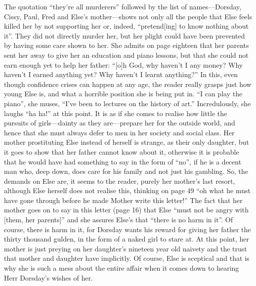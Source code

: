 \documentclass[12pt,a4paper]{article}
\begin{document}
The quotation ``they're all murderers'' followed by the list of names---Dorsday, Cissy, Paul, Fred and Else's mother---shows not only all the people that Else feels killed her by not supporting her or, indeed, ``pretend[ing] to know nothing about it''. They did not directly murder her, but her plight could have been prevented by having some care shown to her. She admits on page eighteen that her parents sent her away to give her an education and piano lessons, but that she could not earn enough yet to help her father: ``[o]h God, why haven't I any money? Why haven't I earned anything yet? Why haven't I learnt anything?'' In this, even though confidence crises can happen at any age, the reader really grasps just how young Else is, and what a horrible position she is being put in. ``I can play the piano'', she muses, ``I've been to lectures on the history of art.'' Incredulously, she laughs ``ha ha!'' at this point. It is as if she comes to realise how little the pursuits of girls---dainty as they are---prepare her for the outside world, and hence that she must always defer to men in her society and social class. Her mother prostituting Else instead of herself is strange, as their only daughter, but it goes to show that her father cannot know about it, otherwise it is probable that he would have had something to say in the form of ``no'', if he is a decent man who, deep down, does care for his family and not just his gambling. So, the demands on Else are, it seems to the reader, purely her mother's last resort, although Else herself does not realise this, thinking on page 49 ``oh what he must have gone through before he made Mother write this letter!'' The fact that her mother goes on to say in this letter (page 16) that Else ``must not be angry with [them, her parents]'' and she assures Else's that ``there is no harm in it''. Of course, there is harm in it, for Dorsday wants his reward for giving her father the thirty thousand gulden, in the form of a naked girl to stare at. At this point, her mother is just preying on her daughter's nineteen year old naivety and the trust that mother and daughter have implicitly. Of course, Else is sceptical and that is why she is such a mess about the entire affair when it comes down to hearing Herr Dorsday's wishes of her.\\
\end{document}
